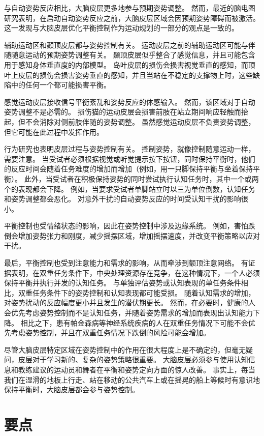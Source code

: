 与自动姿势反应相比，大脑皮层更多地参与预期姿势调整。
然而，最近的脑电图研究表明，在启动自动姿势反应之前，大脑皮层区域会因预期姿势障碍而被激活。
这一发现与大脑皮层优化平衡控制作为运动规划的一部分的观点是一致的。


辅助运动区和颞顶皮层都与姿势控制有关。
运动皮层之前的辅助运动区可能与伴随随意运动的预期姿势调整有关。
颞顶皮层似乎整合了感觉信息，并且可能包含用于感知身体垂直度的内部模型。
岛叶皮层的损伤会损害视觉垂直的感知，而顶叶上皮层的损伤会损害姿势垂直的感知，并且当站在不稳定的支撑物上时，这些缺陷中的任何一个都可能损害平衡。


感觉运动皮层接收信号平衡紊乱和姿势反应的体感输入。
然而，该区域对于自动姿势调整不是必需的。
损伤猫的运动皮层会损害前肢在站立期间响应轻触而抬起，但不会消除对侧前肢伴随的姿势调整。
虽然感觉运动皮层不负责姿势调整，但它可能在此过程中发挥作用。


行为研究也表明皮层过程与姿势控制有关。
控制姿势，就像控制随意运动一样，需要注意。
当受试者必须根据视觉或听觉提示按下按钮，同时保持平衡时，他们的反应时间会随着任务难度的增加而增加（例如，用一只脚保持平衡与坐着保持平衡）。
此外，当受试者在积极保持姿势的同时尝试执行认知任务时，其中一个或两个的表现都会下降。
例如，当要求受试者单脚站立时以三为单位倒数，认知任务和姿势调整都会恶化。
对意外干扰的自动姿势反应的时间受认知干扰的影响很小。


平衡控制也受情绪状态的影响，因此在姿势控制中涉及边缘系统。
例如，害怕跌倒会增加姿势张力和刚度，减少摇摆区域，增加摇摆速度，并改变平衡策略以应对干扰。


最后，平衡控制也受到注意能力和需求的影响，从而牵涉到额顶注意网络。
有证据表明，在双重任务条件下，中央处理资源存在竞争，在这种情况下，一个人必须保持平衡并执行并发的认知任务。
与单独评估姿势或认知表现的单任务条件相比，双重任务条件下的姿势控制和认知表现都可能受损。
随着认知需求的增加，对姿势扰动的反应幅度更小并且发生的潜伏期更长。
然而，在必要时，健康的人会优先考虑姿势控制而不是认知任务，并随着姿势需求的增加而表现出认知能力下降。
相比之下，患有帕金森病等神经系统疾病的人在双重任务情况下可能不会优先考虑姿势控制，并且在双重任务情况下跌倒的风险可能会增加。


尽管大脑皮层特定区域在姿势控制中的作用在很大程度上是不确定的，但毫无疑问，皮层对于学习新的、复杂的姿势策略很重要。
大脑皮层必须参与使用认知信息和教练建议的运动员和舞者在平衡和姿势定向方面的惊人改善。
事实上，每当我们在湿滑的地板上行走、站在移动的公共汽车上或在摇晃的船上等候时有意识地保持平衡时，大脑皮层都会参与姿势控制。



\section{要点}

